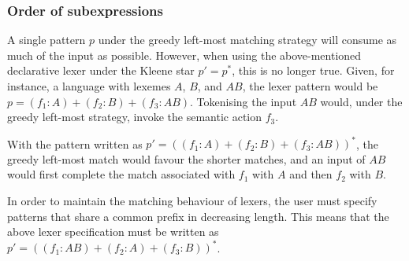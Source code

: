 \subsubsection{Order of subexpressions}

A single pattern $p$ under the greedy left-most matching strategy will consume
as much of the input as possible. However, when using the above-mentioned
declarative lexer under the Kleene star $p' = p^*$, this is no longer true.
Given, for instance, a language with lexemes $A$, $B$, and $AB$, the lexer
pattern would be $p = (f_1:A) + (f_2:B) + (f_3:AB)$. Tokenising the input $AB$
would, under the greedy left-most strategy, invoke the semantic action $f_3$.

With the pattern written as $p' = ((f_1:A) + (f_2:B) + (f_3:AB))^*$, the greedy
left-most match would favour the shorter matches, and an input of $AB$ would
first complete the match associated with $f_1$ with $A$ and then $f_2$ with $B$.

In order to maintain the matching behaviour of lexers, the user must specify
patterns that share a common prefix in decreasing length. This means that the
above lexer specification must be written as $p' = ((f_1:AB) + (f_2:A) +
(f_3:B))^*$.


